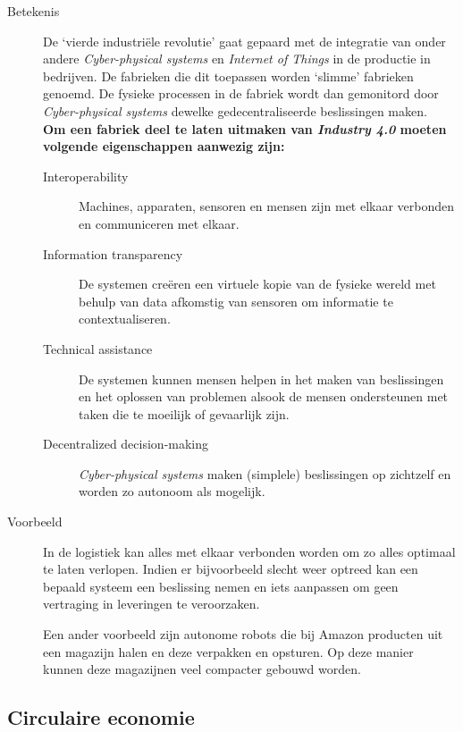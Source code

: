 \documentclass[11pt,a4paper,twoside]{article} %
\begin{document}
\begin{description}
	\item [Betekenis] De `vierde industriële revolutie' gaat gepaard met de integratie van onder andere \textit{Cyber-physical systems} en \textit{Internet of Things} in de productie in bedrijven. De fabrieken die dit toepassen worden `slimme' fabrieken genoemd. De fysieke processen in de fabriek wordt dan gemonitord door \textit{Cyber-physical systems} dewelke gedecentraliseerde beslissingen maken.\\

	\cite{industry42} \textbf{Om een fabriek deel te laten uitmaken van \textit{Industry 4.0} moeten volgende eigenschappen aanwezig zijn:}
	\begin{description}
		\item [Interoperability] Machines, apparaten, sensoren en mensen zijn met elkaar verbonden en communiceren met elkaar.
		\item [Information transparency] De systemen creëren een virtuele kopie van de fysieke wereld met behulp van data afkomstig van sensoren om informatie te contextualiseren.
		\item [Technical assistance] De systemen kunnen mensen helpen in het maken van beslissingen en het oplossen van problemen alsook de mensen ondersteunen met taken die te moeilijk of gevaarlijk zijn.
		\item [Decentralized decision-making] \textit{Cyber-physical systems} maken (simplele) beslissingen op zichtzelf en worden zo autonoom als mogelijk.
	\end{description}
	\vspace{0.5cm}

	\item [Voorbeeld] \cite{industry43} In de logistiek kan alles met elkaar verbonden worden om zo alles optimaal te laten verlopen. Indien er bijvoorbeeld slecht weer optreed kan een bepaald systeem een beslissing nemen en iets aanpassen om geen vertraging in leveringen te veroorzaken.

	Een ander voorbeeld zijn autonome robots die bij Amazon producten uit een magazijn halen en deze verpakken en opsturen. Op deze manier kunnen deze magazijnen veel compacter gebouwd worden.

\end{description}

\clearpage


\subsection{Circulaire economie}
\end{document}
